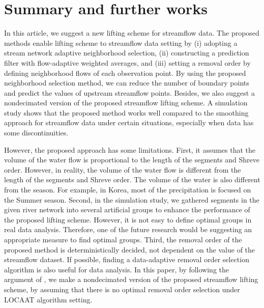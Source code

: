 \documentclass[11pt,titlepage]{article}
\begin{document}
\section{Summary and further works}\label{sec:streamflowsummary}

In this article, we suggest a new lifting scheme for streamflow data. The proposed methods enable lifting scheme to streamflow data setting by (i) adopting a stream network adaptive neighborhood selection, (ii) constructing a prediction filter with flow-adaptive weighted averages, and (iii) setting a removal order by defining neighborhood flows of each observation point. By using the proposed neighborhood selection method, we can reduce the number of boundary points and predict the values of upstream streamflow points. Besides, we also suggest a nondecimated version of the proposed streamflow lifting scheme. A simulation study shows that the proposed method works well compared to the smoothing approach for streamflow data under certain situations, especially when data has some discontinuities.

However, the proposed approach has some limitations. First, it assumes that the volume of the water flow is proportional to the length of the segments and Shreve order. However, in reality, the volume of the water flow is different from the length of the segments and Shreve order.
The volume of the water is also different from the season. For example, in Korea, most of the precipitation is focused on the Summer season. Second, in the simulation study, we gathered segments in the given river network into several artificial groups to enhance the performance of the proposed lifting scheme. However, it is not easy to define optimal groups in real data analysis. Therefore, one of the future research would be suggesting an appropriate measure to find optimal groups.
Third, the removal order of the proposed method is deterministically decided, not dependent on the value of the streamflow dataset. If possible, finding a data-adaptive removal order selection algorithm is also useful for data analysis. In this paper, by following the argument of \cite{Knight2009}, we make a nondecimated version of the proposed streamflow lifting scheme, by assuming that there is no optimal removal order selection under LOCAAT algorithm setting.

\end{document}
